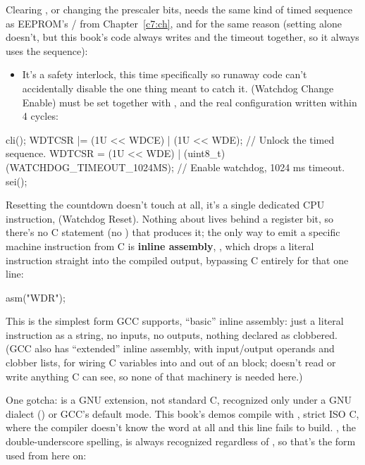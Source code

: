 Clearing , or changing the prescaler bits, needs the same kind of timed sequence as
EEPROM's / from Chapter~\ref{c7:ch}, and for the same reason (setting
 alone doesn't, but this book's code always writes  and the timeout together,
so it always uses the sequence):
\begin{itemize}
  \item It's a safety interlock, this time specifically so runaway code can't accidentally disable
    the one thing meant to catch it.  (Watchdog Change Enable) must be set together with
    , and the real configuration written within 4 cycles:
\end{itemize}

\begin{ccode}
cli();
WDTCSR |= (1U << WDCE) | (1U << WDE);                      // Unlock the timed sequence.
WDTCSR = (1U << WDE) | (uint8_t)(WATCHDOG_TIMEOUT_1024MS); // Enable watchdog, 1024 ms timeout.
sei();
\end{ccode}

\noindent Resetting the countdown doesn't touch  at all, it's a single dedicated CPU
instruction,  (Watchdog Reset). Nothing about  lives behind a register bit, so
there's no C statement (no ) that produces it; the only way to emit a specific
machine instruction from C is \textbf{inline assembly}, , which drops a literal
instruction straight into the compiled output, bypassing C entirely for that one line:

\begin{ccode}
asm("WDR");
\end{ccode}

\noindent This is the simplest form GCC supports, ``basic'' inline assembly: just a literal
instruction as a string, no inputs, no outputs, nothing declared as clobbered. (GCC also has
``extended'' inline assembly, with input/output operands and clobber lists, for wiring C variables
into and out of an  block;  doesn't read or write anything C can see, so none of
that machinery is needed here.)

One gotcha:  is a GNU extension, not standard C, recognized only under a GNU dialect
() or GCC's default mode. This book's demos compile with , strict
ISO C, where the compiler doesn't know the word  at all and this line fails to build.
, the double-underscore spelling, is always recognized regardless of , so
that's the form used from here on:

